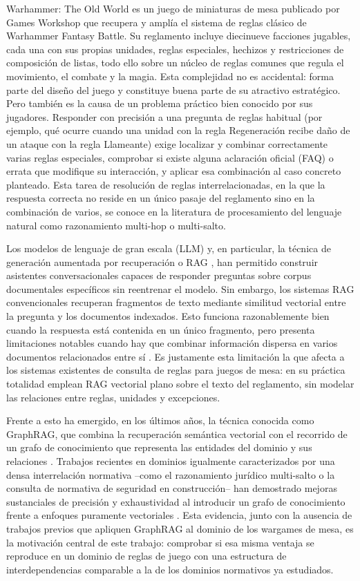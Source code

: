 \documentclass[11pt,a4paper,spanish]{book}
\numberwithin{equation}{chapter}
\numberwithin{figure}{chapter}
\numberwithin{table}{chapter}
\begin{document}
Warhammer: The Old World es un juego de miniaturas de mesa publicado por Games Workshop que recupera y amplía el sistema de reglas clásico de Warhammer Fantasy Battle. Su reglamento incluye diecinueve facciones jugables, cada una con sus propias unidades, reglas especiales, hechizos y restricciones de composición de listas, todo ello sobre un núcleo de reglas comunes que regula el movimiento, el combate y la magia. Esta complejidad no es accidental: forma parte del diseño del juego y constituye buena parte de su atractivo estratégico. Pero también es la causa de un problema práctico bien conocido por sus jugadores. Responder con precisión a una pregunta de reglas habitual (por ejemplo, qué ocurre cuando una unidad con la regla Regeneración recibe daño de un ataque con la regla Llameante) exige localizar y combinar correctamente varias reglas especiales, comprobar si existe alguna aclaración oficial (FAQ) o errata que modifique su interacción, y aplicar esa combinación al caso concreto planteado. Esta tarea de resolución de reglas interrelacionadas, en la que la respuesta correcta no reside en un único pasaje del reglamento sino en la combinación de varios, se conoce en la literatura de procesamiento del lenguaje natural como razonamiento multi-hop o multi-salto.

Los modelos de lenguaje de gran escala (LLM) y, en particular, la técnica de generación aumentada por recuperación o RAG , han permitido construir asistentes conversacionales capaces de responder preguntas sobre corpus documentales específicos sin reentrenar el modelo. Sin embargo, los sistemas RAG convencionales recuperan fragmentos de texto mediante similitud vectorial entre la pregunta y los documentos indexados. Esto funciona razonablemente bien cuando la respuesta está contenida en un único fragmento, pero presenta limitaciones notables cuando hay que combinar información dispersa en varios documentos relacionados entre sí \cite{peng2024graphragsurvey}. Es justamente esta limitación la que afecta a los sistemas existentes de consulta de reglas para juegos de mesa: en su práctica totalidad emplean RAG vectorial plano sobre el texto del reglamento, sin modelar las relaciones entre reglas, unidades y excepciones.

Frente a esto ha emergido, en los últimos años, la técnica conocida como GraphRAG, que combina la recuperación semántica vectorial con el recorrido de un grafo de conocimiento que representa las entidades del dominio y sus relaciones \cite{edge2024graphrag}. Trabajos recientes en dominios igualmente caracterizados por una densa interrelación normativa --como el razonamiento jurídico multi-salto o la consulta de normativa de seguridad en construcción-- han demostrado mejoras sustanciales de precisión y exhaustividad al introducir un grafo de conocimiento frente a enfoques puramente vectoriales \cite{bifrostrag2025}. Esta evidencia, junto con la ausencia de trabajos previos que apliquen GraphRAG al dominio de los wargames de mesa, es la motivación central de este trabajo: comprobar si esa misma ventaja se reproduce en un dominio de reglas de juego con una estructura de interdependencias comparable a la de los dominios normativos ya estudiados.
\end{document}
